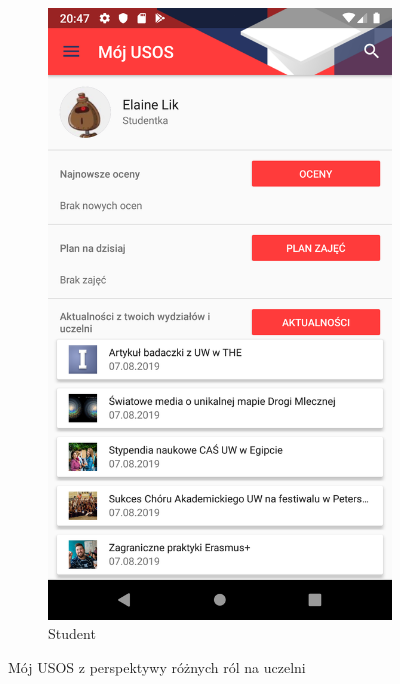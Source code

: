 \documentclass{pracamgr}
\begin{document}
\begin{figure}[p]
\begin{subfigure}[t]{0.3\textwidth}
		\label{fig:myusos_employee}
	\end{subfigure}
	\quad
	\begin{subfigure}[t]{0.3\textwidth}
		\includegraphics[width=\textwidth]{img/myusos_student.png}
		\caption{Student}
		\label{fig:myusos_student}
	\end{subfigure}
	
	\caption{Mój USOS z perspektywy różnych ról na uczelni}\label{fig:myusos}
	\medskip
\end{figure}
\end{document}
